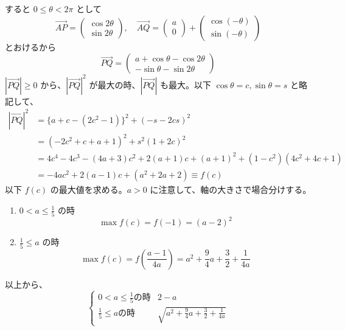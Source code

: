 \documentclass[../main.tex]{subfiles}
\begin{document}
\noindent
すると $0 \le \theta < 2\pi$ として
\[
  \vec{AP} =
  \begin{pmatrix} \cos 2\theta \\ \sin 2\theta
  \end{pmatrix}, \quad
  \vec{AQ} =
  \begin{pmatrix} a \\ 0
  \end{pmatrix} +
  \begin{pmatrix} \cos(-\theta) \\ \sin(-\theta)
  \end{pmatrix}
\]
とおけるから
\[
  \vec{PQ} =
  \begin{pmatrix} a + \cos\theta - \cos 2\theta \\ -\sin\theta - \sin 2\theta
  \end{pmatrix}
\]
$|\vec{PQ}| \ge 0$ から、$|\vec{PQ}|^2$ が最大の時、$|\vec{PQ}|$ も最大。以下 $\cos\theta = c, \sin\theta = s$ と略記して、
\begin{align*}
  |\vec{PQ}|^2 &= \{ a + c - (2c^2 - 1) \}^2 + (-s - 2cs)^2 \\
  &= (-2c^2 + c + a + 1)^2 + s^2(1 + 2c)^2 \\
  &= 4c^4 - 4c^3 - (4a + 3)c^2 + 2(a + 1)c + (a + 1)^2 + (1 - c^2)(4c^2 + 4c + 1) \\
  &= -4ac^2 + 2(a - 1)c + (a^2 + 2a + 2) \equiv f(c)
\end{align*}
以下 $f(c)$ の最大値を求める。$a > 0$ に注意して、軸の大きさで場合分けする。

\begin{center}
\end{center}

\begin{enumerate}
  \item[$1^\circ$] $0 < a \le \frac{1}{5}$ の時
    \[
      \max f(c) = f(-1) = (a - 2)^2
    \]
  \item[$2^\circ$] $\frac{1}{5} \le a$ の時
    \[
      \max f(c) = f\left(\frac{a-1}{4a}\right) = a^2 + \frac{9}{4}a + \frac{3}{2} + \frac{1}{4a}
    \]
\end{enumerate}
以上から、
\[
  \begin{cases}
    0 < a \le \frac{1}{5} \text{の時} & 2 - a \\
    \frac{1}{5} \le a \text{の時} & \sqrt{a^2 + \frac{9}{4}a + \frac{3}{2} + \frac{1}{4a}}
  \end{cases}
\]
\end{document}
